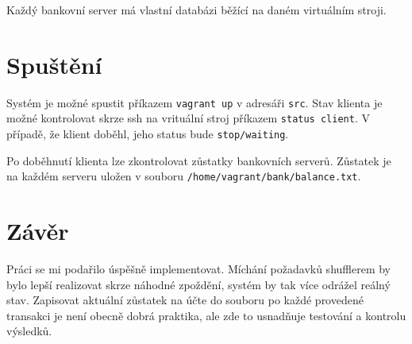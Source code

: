 \documentclass[11pt,a4paper]{scrartcl}
\begin{document}
	Každý bankovní server má vlastní databázi běžící na daném virtuálním stroji.

	
	\section{Spuštění}
	
	Systém je možné spustit příkazem \verb|vagrant up| v adresáři \verb|src|. Stav klienta je možné kontrolovat skrze ssh na vrituální stroj příkazem \verb|status client|. V případě, že klient doběhl, jeho status bude \verb|stop/waiting|.
	
	Po doběhnutí klienta lze zkontrolovat zůstatky bankovních serverů. Zůstatek je na každém serveru uložen v souboru \verb|/home/vagrant/bank/balance.txt|.
	
	\section{Závěr}
	Práci se mi podařilo úspěšně implementovat. Míchání požadavků shufflerem by bylo lepší realizovat skrze náhodné zpoždění, systém by tak více odrážel reálný stav. Zapisovat aktuální zůstatek na účte do souboru po každé provedené transakci je není obecně dobrá praktika, ale zde to usnadňuje testování a kontrolu výsledků.
	
\end{document}
